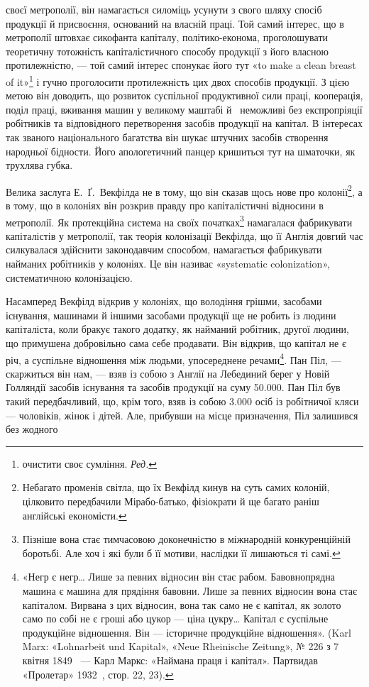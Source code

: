 \parcont{}  %
своєї метрополії, він намагається силоміць усунути з свого шляху спосіб продукції й присвоєння,
оснований на власній праці. Той самий інтерес, що в метрополії штовхає сикофанта капіталу,
політико-економа, проголошувати теоретичну тотожність капіталістичного способу продукції з його
власною протилежністю, — той самий інтерес спонукає його тут «to make a clean breast of it»\footnote*{
очистити своє сумління. \emph{Ред.}
} і гучно
проголосити протилежність цих двох способів продукції. З цією метою він доводить, що розвиток
суспільної продуктивної сили праці, кооперація, поділ праці, вживання машин у великому маштабі й~ неможливі без експропріяції робітників та відповідного перетворення засобів продукції на
капітал. В інтересах так званого національного багатства він шукає штучних засобів створення
народньої бідности. Його апологетичний панцер кришиться тут на шматочки, як трухлява губка.

Велика заслуга Е.~Ґ.~Векфілда не в тому, що він сказав щось нове про колонії\footnote{
Небагато променів світла, що їх Векфілд кинув на суть самих колоній, цілковито передбачили
Мірабо-батько, фізіократи й ще багато раніш англійські економісти.
}, а в тому, що в
колоніях він розкрив правду про капіталістичні відносини в метрополії. Як протекційна система на
своїх початках\footnote{
Пізніше вона стає тимчасовою доконечністю в міжнародній конкуренційній боротьбі. Але хоч і які
були б її мотиви, наслідки її лишаються ті самі.
} намагалася фабрикувати капіталістів
у метрополії, так теорія колонізації Векфілда, що її Англія довгий час силкувалася здійснити
законодавчим способом, намагається фабрикувати найманих робітників у колоніях. Це він називає
«systematic colonization», систематичною колонізацією.

Насамперед Векфілд відкрив у колоніях, що володіння грішми, засобами існування, машинами й іншими
засобами продукції ще не робить із людини капіталіста, коли бракує такого додатку, як найманий
робітник, другої людини, що примушена добровільно сама себе продавати. Він відкрив, що капітал не є
річ, а суспільне відношення між людьми, упосереднене речами\footnote{
«Негр є негр\dots{} Лише за певних відносин він стає рабом. Бавовнопрядна машина є машина для
прядіння бавовни. Лише за певних відносин вона стає капіталом. Вирвана з цих відносин, вона так само
не є капітал, як золото само по собі не є гроші або цукор — ціна цукру\dots{} Капітал є суспільне
продукційне відношення. Він — історичне продукційне відношення». (Karl Marx: «Lohnarbeit und
Kapital», «Neue Rheinische Zeitung», № 226 з 7 квітня 1849~ — Карл Маркс: «Наймана праця і
капітал». Партвидав «Пролетар» 1932~, стор. 22, 23).
}. Пан Піл, — скаржиться він нам, —
взяв із собою з Англії на Лебединий берег у Новій Голляндії засобів існування та засобів продукції
на суму \num{50.000}. Пан Піл був такий передбачливий, що, крім того, взяв із собою
\num{3.000} осіб із робітничої кляси — чоловіків, жінок і дітей. Але, прибувши на місце призначення, Піл
залишився без жодного
\parbreak{}  %
